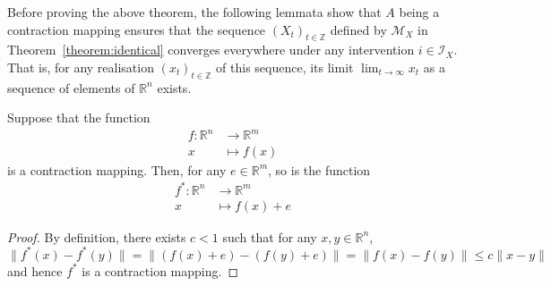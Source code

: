 \medskip

Before proving the above theorem, the following lemmata show that $A$ being a contraction mapping ensures that the sequence $(X_t)_{t\in\mathbb{Z}}$ defined by $\mathcal{M}_X$ in Theorem~\ref{theorem:identical} converges everywhere under any intervention $i\in\mathcal{I}_X$.
That is, for any realisation $(x_t)_{t\in\mathbb{Z}}$ of this sequence, its limit $\lim_{t\rightarrow \infty}x_t$ as a sequence of elements of $\mathbb{R}^n$ exists.

\medskip

\begin{lemma}\label{lemma:contraction_add}
Suppose that the function
\begin{align*}
f: \mathbb{R}^n & \rightarrow \mathbb{R}^m \\
 x & \mapsto f(x)
\end{align*}
is a contraction mapping.
Then, for any $e \in \mathbb{R}^m$, so is the function
\begin{align*}
f^*: \mathbb{R}^n & \rightarrow \mathbb{R}^m \\
 x & \mapsto f(x) + e
\end{align*}
\end{lemma}

\medskip

\begin{proof}
By definition, there exists $c<1$ such that for any $x,y\in \mathbb{R}^n$,
\[
\| f^*(x)-f^*(y) \| = \| (f(x)+e)-(f(y)+e) \| = \| f(x)-f(y) \| \leq c \| x - y \|
\]
and hence $f^*$ is a contraction mapping.
\end{proof}

\medskip

